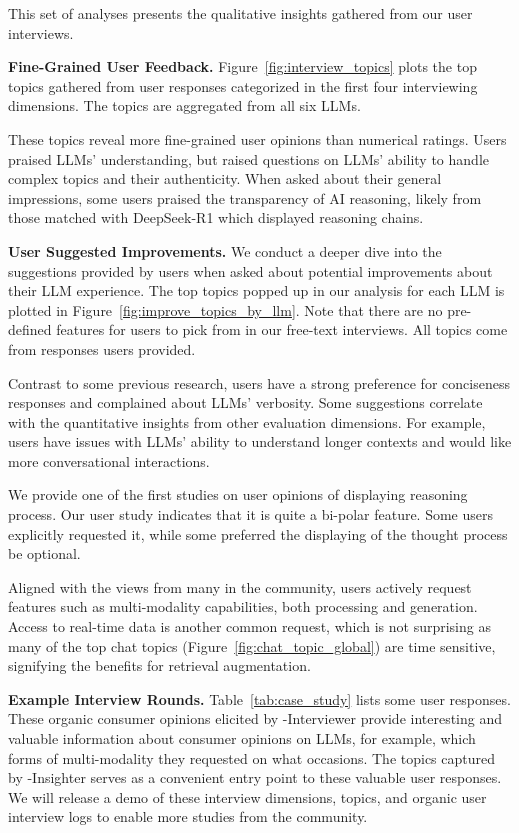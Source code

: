 This set of analyses presents the qualitative insights gathered from our user interviews. 

\textbf{Fine-Grained User Feedback.} Figure~\ref{fig:interview_topics} plots the top topics gathered from user responses categorized in the first four interviewing dimensions. The topics are aggregated from all six LLMs. 

These topics reveal more fine-grained user opinions than numerical ratings. 
Users praised LLMs' understanding, but raised questions on LLMs' ability to handle complex topics and their authenticity.
When asked about their general impressions,
some users praised the transparency of AI reasoning, likely from those matched with DeepSeek-R1 which displayed reasoning chains.

\textbf{User Suggested Improvements.} We conduct a deeper dive into the suggestions provided by users when asked about potential improvements about their LLM experience. 
The top topics popped up in our analysis for each LLM is plotted in Figure~\ref{fig:improve_topics_by_llm}. 
Note that there are no pre-defined features for users to pick from in our free-text interviews. All topics come from responses users provided.

Contrast to some previous research, users have a strong preference for conciseness responses and complained about LLMs' verbosity.
Some suggestions correlate with the quantitative insights from other evaluation dimensions. For example, users have issues with LLMs' ability to understand longer contexts and would like more conversational interactions. 

We provide one of the first studies on user opinions of displaying reasoning process. Our user study indicates that it is quite a bi-polar feature. Some users explicitly requested it, while some preferred the displaying of the thought process be optional. 

Aligned with the views from many in the community, users actively request features such as multi-modality capabilities, both processing and generation. Access to real-time data is another common request, which is not surprising as many of the top chat topics (Figure~\ref{fig:chat_topic_global}) are time sensitive, signifying the benefits for retrieval augmentation.

\textbf{Example Interview Rounds.} Table~\ref{tab:case_study} lists some user responses. 
These organic consumer opinions elicited by \method-Interviewer provide interesting and valuable information about consumer opinions on LLMs, for example, which forms of multi-modality they requested on what occasions. 
The topics captured by \method-Insighter serves as a convenient entry point to these valuable user responses. We will release a demo of these interview dimensions, topics, and organic user interview logs to enable more studies from the community.